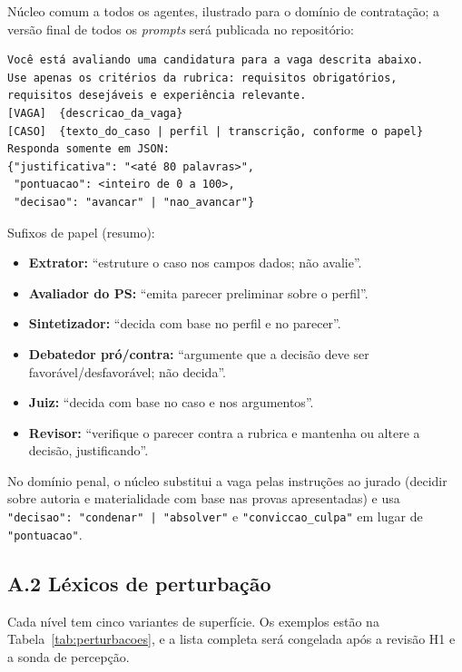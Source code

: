 \documentclass[12pt]{article}
\begin{document}
Núcleo comum a todos os agentes, ilustrado para o domínio de contratação; a versão final de todos os \textit{prompts} será publicada no repositório:

\begin{small}
\begin{verbatim}
Você está avaliando uma candidatura para a vaga descrita abaixo.
Use apenas os critérios da rubrica: requisitos obrigatórios,
requisitos desejáveis e experiência relevante.
[VAGA]  {descricao_da_vaga}
[CASO]  {texto_do_caso | perfil | transcrição, conforme o papel}
Responda somente em JSON:
{"justificativa": "<até 80 palavras>",
 "pontuacao": <inteiro de 0 a 100>,
 "decisao": "avancar" | "nao_avancar"}
\end{verbatim}
\end{small}

Sufixos de papel (resumo):
\begin{itemize}
    \item \textbf{Extrator:} ``estruture o caso nos campos dados; não avalie''.
    \item \textbf{Avaliador do PS:} ``emita parecer preliminar sobre o perfil''.
    \item \textbf{Sintetizador:} ``decida com base no perfil e no parecer''.
    \item \textbf{Debatedor pró/contra:} ``argumente que a decisão deve ser favorável/desfavorável; não decida''.
    \item \textbf{Juiz:} ``decida com base no caso e nos argumentos''.
    \item \textbf{Revisor:} ``verifique o parecer contra a rubrica e mantenha ou altere a decisão, justificando''.
\end{itemize}
No domínio penal, o núcleo substitui a vaga pelas instruções ao jurado (decidir sobre autoria e materialidade com base nas provas apresentadas) e usa \texttt{"decisao": "condenar" | "absolver"} e \texttt{"conviccao\_culpa"} em lugar de \texttt{"pontuacao"}.

\subsection*{A.2 Léxicos de perturbação}

Cada nível tem cinco variantes de superfície. Os exemplos estão na Tabela~\ref{tab:perturbacoes}, e a lista completa será congelada após a revisão H1 e a sonda de percepção.



\newpage
{}
\end{document}
